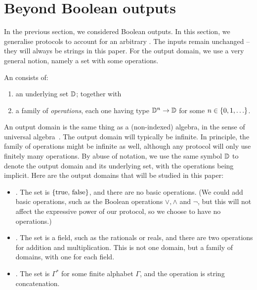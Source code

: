 \section{Beyond Boolean outputs}
\label{sec:beyond-boolean-outputs}

In the previous section, we considered Boolean outputs. In this section, we
generalise protocols to account for an arbitrary . The inputs
remain unchanged -- they will always be strings in this paper.  For the
output domain, we use a very general notion, namely a set with some
operations. 
\begin{definition}
  \AP
    An  consists of: 
    \begin{enumerate}
        \item an underlying set $\mathbb D$; together with
        \item a family of \emph{operations}, each one having  type $\mathbb D^n \to \mathbb D$ for some $n \in \{0,1,\ldots\}$.
    \end{enumerate}
\end{definition}
An output domain is the same thing as a (non-indexed) algebra, in the sense of universal algebra~\cite[p.5]{hobby1988structure}. 
The output domain will typically  be infinite. In principle, the family of operations might be infinite as well,
although any protocol will only use finitely many operations.
By abuse of notation, we use the same symbol $\mathbb D$ to denote the output domain and its underlying set, with the operations being implicit. Here are the output domains that will be studied in this paper: 
\begin{itemize}
    \item {}. The set is $\{\text{true, false}\}$, and there are no basic operations. (We could add basic operations, such as the Boolean operations $\lor,\land$ and $\neg$, but this will not affect the expressive power of our protocol, so we choose to have no operations.)
    \item {}. The set is a field, such as the rationals or reals, and there are two operations for addition and multiplication. This is not one domain, but a family of domains, with one for each field.
    \item {}. The set is $\Gamma^*$ for some finite alphabet $\Gamma$, and the operation is string concatenation.
\end{itemize}

